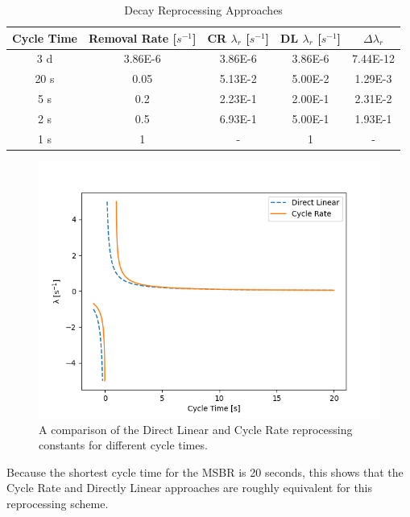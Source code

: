 \begin{table}[H]
\renewcommand{\arraystretch}{1.25}
\caption{Decay Reprocessing Approaches}
\label{tab:repr_decay_view}
\begin{center}
\begin{tabular}{ | c | c | c | c | c | }
 \hline
 Cycle Time & Removal Rate [$s^{-1}$] & CR $\lambda_{r}$ [$s^{-1}$] & DL $\lambda_{r}$ [$s^{-1}$] & $\Delta \lambda_{r}$\\
 \hline
 \hline
 3 d & 3.86E-6 & 3.86E-6 & 3.86E-6 & 7.44E-12\\
 20 s & 0.05 & 5.13E-2 & 5.00E-2 & 1.29E-3\\
 5 s & 0.2 & 2.23E-1 & 2.00E-1 & 2.31E-2\\
 2 s & 0.5 & 6.93E-1 & 5.00E-1 & 1.93E-1\\
 1 s & 1 & - & 1 & -\\
 \hline
\end{tabular}
\end{center}
\end{table}

\begin{figure}[H]
  \centering
  \includegraphics[scale=0.55]{images/dl_cr_asymptote.png}
  \caption{A comparison of the Direct Linear and Cycle Rate reprocessing constants for different cycle times.}
   \label{fig:dl_cr_asymptotic}
\end{figure}

Because the shortest cycle time for the MSBR is 20 seconds, this shows that the Cycle Rate and Directly Linear approaches are roughly equivalent for this reprocessing scheme.

